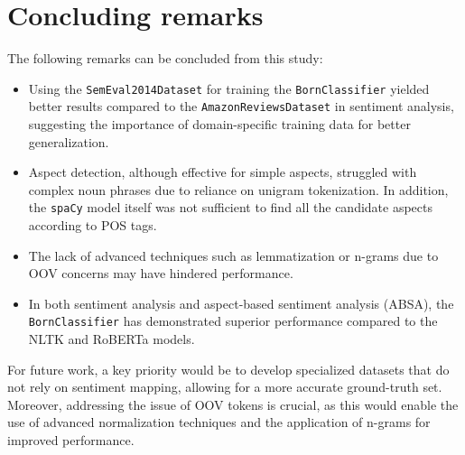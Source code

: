 
\section{Concluding remarks}\label{sec4}

The following remarks can be concluded from this study:
\begin{itemize}
    \item Using the \texttt{SemEval2014Dataset} for training the \texttt{BornClassifier} yielded better results compared to the \texttt{AmazonReviewsDataset} in sentiment analysis, suggesting the importance of domain-specific training data for better generalization.

    \item Aspect detection, although effective for simple aspects, struggled with complex noun phrases due to reliance on unigram tokenization. In addition, the \texttt{spaCy} model itself was not sufficient to find all the candidate aspects according to POS tags.
    
    \item The lack of advanced techniques such as lemmatization or n-grams due to OOV concerns may have hindered performance.

    \item In both sentiment analysis and aspect-based sentiment analysis (ABSA), the \texttt{BornClassifier} has demonstrated superior performance compared to the NLTK and RoBERTa models.
\end{itemize}

For future work, a key priority would be to develop specialized datasets that do not rely on sentiment mapping, allowing for a more accurate ground-truth set. Moreover, addressing the issue of OOV tokens is crucial, as this would enable the use of advanced normalization techniques and the application of n-grams for improved performance.\newpage